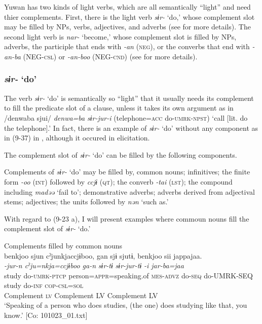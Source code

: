 Yuwan has two kinds of light verbs, which are all semantically “light” and need thier complements. First, there is the light verb \textit{sɨr-} ‘do,’ whose complement slot may be filled by NPs, verbs, adjectives, and adverbs (see  for more details). The second light verb is \textit{nar-} ‘become,’ whose complement slot is filled by NPs, adverbs, the participle that ends with \textit{{}-an} (\textsc{neg}), or the converbs that end with \textit{{}-an-ba} (NEG-\textsc{csl}) or \textit{{}-an-boo} (NEG-\textsc{cnd}) (see  for more details).

\subsubsection{\textit{sɨr-} ‘do’}\label{sec:9.1.2.1}

The verb \textit{sɨr-} ‘do’ is semantically so “light” that it usually needs its complement to fill the predicate slot of a clause, unless it takes its own argument as in /denwaba sjui/ \textit{denwa=ba} \textit{sɨr-jur-i} (telephone=\textsc{acc} do-\textsc{umrk}-\textsc{npst}) ‘call [lit. do the telephone].’ In fact, there is an example of \textit{sɨr-} ‘do’ without any component as in (9-37) in , although it occured in elicitation.

The complement slot of \textit{sɨr-} ‘do’ can be filled by the following components.

\ea  Complements of \textit{sɨr-} ‘do’ may be filled by, \label{ex:9.23}
  \ea  common nouns;
  \ex  infinitives;
  \ex  the finite form \textit{{}-oo} (\textsc{int}) followed by \textit{ccjɨ} (\textsc{qt});
  \ex  the converb \textit{{}-tai} (\textsc{lst});
  \ex  the compound including \textit{madəə} ‘fail to’;
  \ex  demonstrative adverbs;
  \ex  adverbs derived from adjectival stems;
  \ex  adjectives;
  \ex  the units followed by \textit{nən} ‘such as.’
  \z
\z

With regard to (9-23 a), I will present examples where commoun nouns fill the complement slot of \textit{sɨr-} ‘do.’

\ea   Complements filled by common nouns \label{ex:9.24}
\ea{}\\
 \gllll    {\textbar}benkjoo{\textbar}  sjun  cˀjunkjaccjɨboo,  gan  sjɨ  sjutɨ,  {\textbar}benkjoo{\textbar}  sii  jappajaa.\\
      \textit{}  \textit{-jur-n  cˀju=nkja=ccjɨboo  ga-n}   \textit{sɨr-tɨ}  \textit{sɨr-jur-tɨ}  \textit{}  \textit{-i  jar-ba=jaa}\\
      study  do-\textsc{umrk}-\textsc{ptcp}  person=\textsc{appr}=speaking.of  \textsc{mes}-\textsc{advz}  do-\textsc{seq}  do-UMRK-SEQ  study  do-\textsc{inf}  \textsc{cop}-\textsc{csl}=\textsc{sol}\\
      Complement  \textsc{lv}    Complement                            LV    Complement  LV  \\
      \glt       ‘Speaking of a person who does studies, (the one) does studying like that, you know.’ [Co: 101023\_01.txt]

